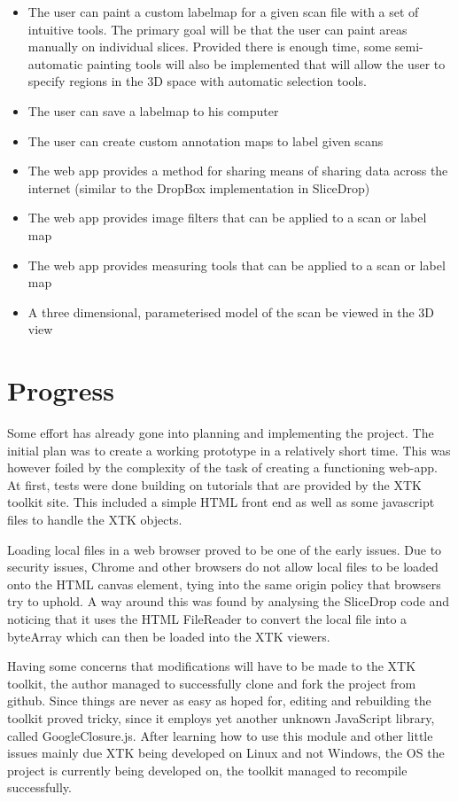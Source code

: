 \documentclass[a4paper,11pt,titlepage]{article}
\begin{document}
\begin{itemize}
\item The user can paint a custom labelmap for a given scan file with a set of intuitive tools. The primary goal will be that the user can paint areas manually on individual slices. Provided there is enough time, some semi-automatic painting tools will also be implemented that will allow the user to specify regions in the 3D space with automatic selection tools. 
\item The user can save a labelmap to his computer
\item The user can create custom annotation maps to label given scans
\item The web app provides a method for sharing  means of sharing data across the internet (similar to the DropBox implementation in SliceDrop)
\item The web app provides image filters that can be applied to a scan or label map
\item The web app provides measuring tools that can be applied to a scan or label map
\item A three dimensional, parameterised model of the scan be viewed in the 3D view
\end{itemize}

\section{Progress}

Some effort has already gone into planning and implementing the project. The initial plan was to create a working prototype in a relatively short time. This was however foiled by the complexity of the task of creating a functioning web-app. At first, tests were done building on tutorials that are provided by the XTK toolkit site. This included a simple HTML front end as well as some javascript files to handle the XTK objects.

Loading local files in a web browser proved to be one of the early issues. Due to security issues, Chrome and other browsers do not allow local files to be loaded onto the HTML canvas element, tying into the same origin policy that browsers try to uphold. A way around this was found by analysing the SliceDrop code and noticing that it uses the HTML FileReader to convert the local file into a byteArray which can then be loaded into the XTK viewers.

Having some concerns that modifications will have to be made to the XTK toolkit, the author managed to successfully clone and fork the project from github. Since things are never as easy as hoped for, editing and rebuilding the toolkit proved tricky, since it employs yet another unknown JavaScript library, called GoogleClosure.js. After learning how to use this module and other little issues mainly due XTK being developed on Linux and not Windows, the OS the project is currently being developed on, the toolkit managed to recompile successfully.
\end{document}
